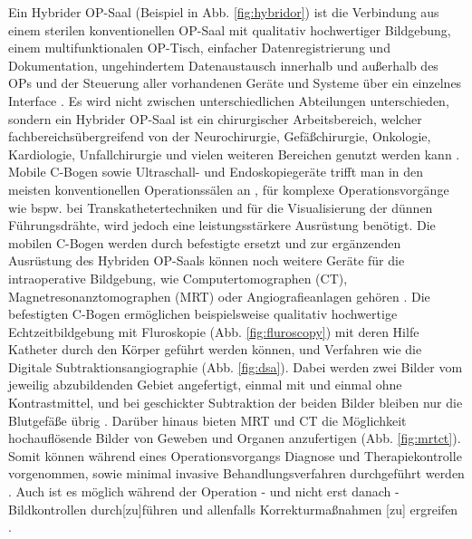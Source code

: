 Ein Hybrider OP-Saal (Beispiel in Abb. \ref{fig:hybridor}) ist die Verbindung aus einem sterilen konventionellen OP-Saal mit qualitativ hochwertiger Bildgebung, einem multifunktionalen OP-Tisch, einfacher Datenregistrierung und Dokumentation, ungehindertem Datenaustausch innerhalb und außerhalb des OPs und der Steuerung aller vorhandenen Geräte und Systeme über ein einzelnes Interface \cite{HybriderVsKonventioneller,KarlStorz}. Es wird nicht zwischen unterschiedlichen Abteilungen unterschieden, sondern ein Hybrider OP-Saal ist ein chirurgischer Arbeitsbereich, welcher fachbereichsübergreifend von der Neurochirurgie, Gefäßchirurgie, Onkologie, Kardiologie, Unfallchirurgie und vielen weiteren Bereichen genutzt werden kann \cite{Getinge}.\\
Mobile C-Bogen sowie Ultraschall- und Endoskopiegeräte trifft man in den meisten konventionellen Operationssälen an \cite{TechnicalConsiderations}, für komplexe Operationsvorgänge wie bspw. bei Transkathetertechniken und für die Visualisierung der dünnen Führungsdrähte, wird jedoch eine leistungsstärkere Ausrüstung benötigt. Die mobilen C-Bogen werden durch befestigte ersetzt und zur ergänzenden Ausrüstung des Hybriden OP-Saals können noch weitere Geräte für die intraoperative Bildgebung, wie Computertomographen (CT), Magnetresonanztomographen (MRT) oder Angiografieanlagen gehören \cite{OPderZukunft}. 
Die befestigten C-Bogen ermöglichen beispielsweise qualitativ hochwertige Echtzeitbildgebung mit Fluroskopie (Abb. \ref{fig:fluroscopy}) mit deren Hilfe Katheter durch den Körper geführt werden können, und Verfahren wie die Digitale Subtraktionsangiographie (Abb. \ref{fig:dsa}). Dabei werden zwei Bilder vom jeweilig abzubildenden Gebiet angefertigt, einmal mit und einmal ohne Kontrastmittel, und bei geschickter Subtraktion der beiden Bilder bleiben nur die Blutgefäße übrig \cite{CurrentAndFuture}. Darüber hinaus bieten MRT und CT die Möglichkeit hochauflösende Bilder von Geweben und Organen anzufertigen (Abb. \ref{fig:mrtct}).\\
Somit können während eines Operationsvorgangs Diagnose und Therapiekontrolle vorgenommen, sowie minimal invasive Behandlungsverfahren durchgeführt werden \cite{SHG-Kliniken}. Auch ist es möglich \glqq während der Operation - und nicht erst danach - Bildkontrollen durch[zu]führen und allenfalls Korrekturmaßnahmen [zu] ergreifen\grqq{} \cite{OPderZukunft}. 

